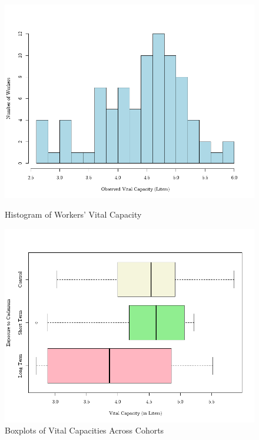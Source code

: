\documentclass{article}
\begin{document}
		\begin{figure}[h!]
			\centering
			\tiny
			\begin{minipage}{0.48\textwidth}
			  \centering
			  \tiny
			  \includegraphics[width=\textwidth]{graphs/HistAllWorkers~VitalCap.png}
			  \caption{Histogram of Workers' Vital Capacity}
			  \label{fig:histogram}
			\end{minipage}\hfill
			\begin{minipage}{0.48\textwidth}
			  \centering
			  \tiny
			  \includegraphics[width=\textwidth]{graphs/BoxPlot_Workers~VitalCap.png}
			  \caption{Boxplots of Vital Capacities Across Cohorts}
			  \label{fig:boxplots}
			\end{minipage}
		\end{figure}
\end{document}
